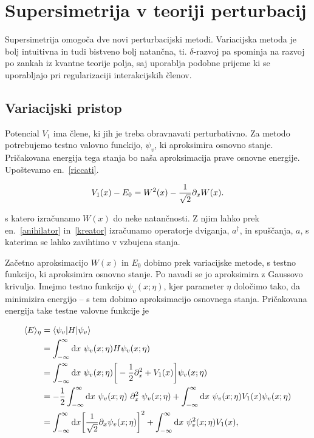 \section{Supersimetrija v teoriji perturbacij}

Supersimetrija omogo\v ca dve novi perturbacijski metodi. Variacijska metoda je bolj intuitivna in tudi bistveno bolj
natan\v cna, ti. $\delta$-razvoj pa spominja na razvoj po zankah iz kvantne teorije polja, saj uporablja podobne prijeme
ki se uporabljajo pri regularizaciji interakcijskih \v clenov.

\subsection{Variacijski pristop}

Potencial $V_1$ ima \v clene, ki jih je treba obravnavati perturbativno. Za metodo potrebujemo testno valovno funckijo, $\psi_v$,
ki aproksimira osnovno stanje. Pri\v cakovana energija tega stanja bo na\v sa aproksimacija prave osnovne energije.
Upo\v stevamo en.~\eqref{riccati}.

\begin{equation}
	V_1(x) - E_0 = W^2(x) - \frac{1}{\sqrt{2}}\partial_x W(x).
\end{equation}

\ni s katero izra\v cunamo $W(x)$ do neke natan\v cnosti. Z njim lahko prek en.~\eqref{anihilator} in~\eqref{kreator} izra\v cunamo
operatorje dviganja, $a^\dagger$, in spu\v s\v canja, $a$, s katerima se lahko zavihtimo v vzbujena stanja.

Za\v cetno aproksimacijo $W(x)$ in $E_0$ dobimo prek variacijske metode, s testno funkcijo, ki aproksimira osnovno stanje. Po
navadi se jo aproksimira z Gaussovo krivuljo. Imejmo testno funkcijo $\psi_v (x;\eta)$, kjer parameter $\eta$ dolo\v cimo tako,
da minimizira energijo -- s tem dobimo aproksimacijo osnovnega stanja. Pri\v cakovana energija take testne valovne funkcije je

\begin{align}
	\langle E \rangle_\eta &= \langle \psi_v| H |\psi_v \rangle \notag \\
	&= \intinf\ \psi_v (x; \eta) H \psi_v (x; \eta) \notag \\
	&= \intinf\ \psi_v (x;\eta) \bigg[-\frac{1}{2}\px^2 + V_1(x)\bigg]\psi_v(x;\eta) \notag \\
	&= -\frac{1}{2}\intinf\ \psi_v(x;\eta)\ \px^2\ \psi_v (x;\eta) + \intinf\ \psi_v(x;\eta)V_1(x)\psi_v(x;\eta) \notag \\
	&= \intinf \bigg[\koren \px \psi_v(x;\eta)\bigg]^2 + \intinf\ \psi_v^2 (x; \eta) V_1 (x), \label{eeta}
\end{align}

